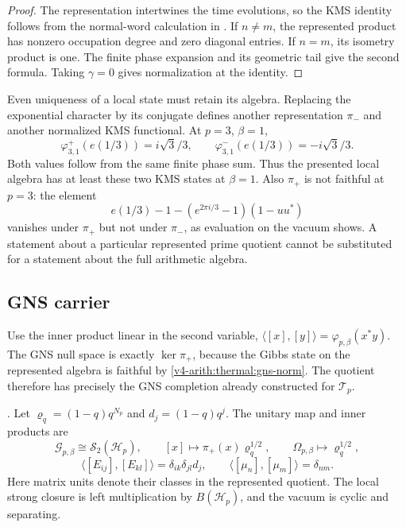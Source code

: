 \begin{proof}
The representation intertwines the time evolutions, so the
KMS identity follows from the normal-word calculation in
. If $n\ne m$,
the represented product has nonzero occupation degree and zero
diagonal entries. If $n=m$, its isometry product is one.
The finite phase expansion and its geometric tail give the
second formula. Taking $\gamma=0$ gives normalization at the
identity.
\end{proof}

Even uniqueness of a local state must retain its algebra.
Replacing the exponential character by its conjugate defines
another representation $\pi_-$ and another normalized KMS
functional. At $p=3$, $\beta=1$,
\[
 \varphi_{3,1}^+(e(1/3))=i\sqrt3/3,
 \qquad \varphi_{3,1}^-(e(1/3))=-i\sqrt3/3.
\]
Both values follow from the same finite phase sum. Thus the
presented local algebra has at least these two KMS states at
$\beta=1$. Also $\pi_+$ is not faithful at $p=3$: the element
\[
 e(1/3)-1-(e^{2\pi i/3}-1)(1-uu^*)
\]
vanishes under $\pi_+$ but not under $\pi_-$, as evaluation on
the vacuum shows. A statement about a particular represented
prime quotient cannot be substituted for a statement about the
full arithmetic algebra.

\subsection{GNS carrier}
\label{v4-arith:kms-gns:cycle1:GNS}

Use the inner product linear in the second variable,
$\langle[x],[y]\rangle=\varphi_{p,\beta}(x^*y)$.
The GNS null space is exactly $\ker\pi_+$, because the Gibbs
state on the represented algebra is faithful by
\eqref{v4-arith:thermal:gns-norm}. The quotient therefore has
precisely the GNS completion already constructed for $\mathcal T_p$.

\begin{lemma}
\label{v4-arith:kms-gns:lem:GNS-space}
\ClaimStatusProvedHere. Let $\varrho_q=(1-q)q^{N_p}$ and
$d_j=(1-q)q^j$. The unitary map and inner products are
\begin{equation}
 \mathscr G_{p,\beta}\cong\mathcal S_2(\mathscr H_p),
 \qquad [x]\longmapsto\pi_+(x)\varrho_q^{1/2},
 \qquad \Omega_{p,\beta}\longmapsto\varrho_q^{1/2},
 \label{v4-arith:kms-gns:eq:GNS-iso}
\end{equation}
\begin{equation}
 \langle[E_{ij}],[E_{kl}]\rangle
      =\delta_{ik}\delta_{jl}d_j,
 \qquad \langle[\mu_n],[\mu_m]\rangle=\delta_{nm}.
 \label{v4-arith:kms-gns:eq:GNS-inner-product}
\end{equation}
Here matrix units denote their classes in the represented
quotient. The local strong closure is left multiplication by
$B(\mathscr H_p)$, and the vacuum is cyclic and separating.
\end{lemma}

